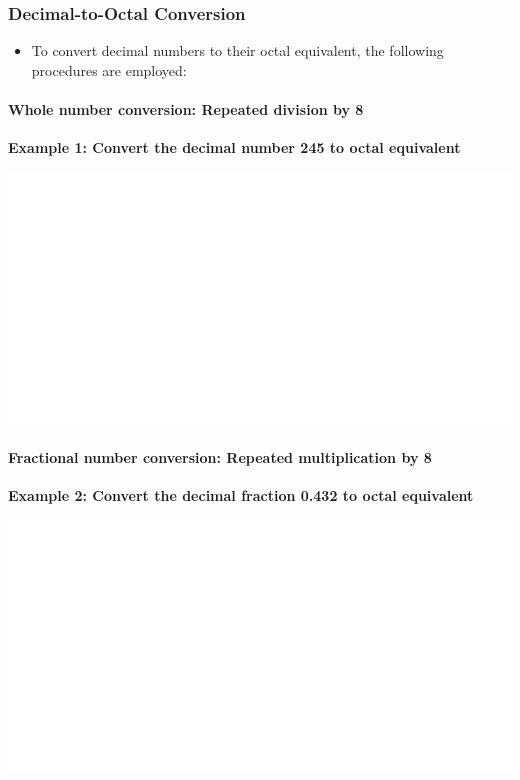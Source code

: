 \documentclass[]{book}
\providecommand{\tightlist}{%
  \setlength{\itemsep}{0pt}\setlength{\parskip}{0pt}}
\let\oldparagraph\paragraph
\renewcommand{\paragraph}[1]{\oldparagraph{#1}\mbox{}}
\begin{document}
\hypertarget{decimal-to-octal-conversion}{%
\subsubsection{Decimal-to-Octal Conversion}\label{decimal-to-octal-conversion}}

\begin{itemize}
\tightlist
\item
  To convert decimal numbers to their octal equivalent, the following procedures are employed:
\end{itemize}

\hypertarget{whole-number-conversion-repeated-division-by-8}{%
\paragraph{Whole number conversion: Repeated division by 8}\label{whole-number-conversion-repeated-division-by-8}}

\textbf{Example 1: Convert the decimal number 245 to octal equivalent}

\begin{center}\includegraphics[width=1\linewidth]{figure/NSbox10-1} \end{center}

\hypertarget{fractional-number-conversion-repeated-multiplication-by-8}{%
\paragraph{Fractional number conversion: Repeated multiplication by 8}\label{fractional-number-conversion-repeated-multiplication-by-8}}

\textbf{Example 2: Convert the decimal fraction 0.432 to octal equivalent}

\begin{center}\includegraphics[width=1\linewidth]{figure/NSbox11-1} \end{center}
\end{document}
